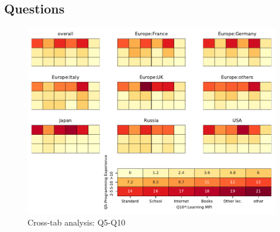 
\subsection{Questions}


\begin{figure}
\begin{center}
\includegraphics[width=12cm]{../pdfs/Q5-Q10.pdf}
\caption{Cross-tab analysis: Q5-Q10}
\label{fig:Q5-Q10}
\end{center}
\end{figure}

